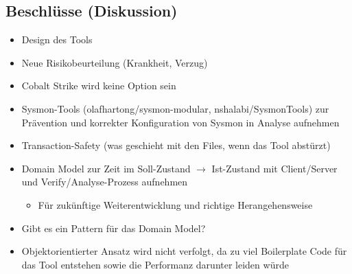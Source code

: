 \vspace{1cm}

\subsection*{Beschlüsse (Diskussion)}
\begin{itemize}
    \item Design des Tools
    \item Neue Risikobeurteilung (Krankheit, Verzug)
    \item Cobalt Strike wird keine Option sein
    \item Sysmon-Tools (olafhartong/sysmon-modular, nshalabi/SysmonTools) zur Prävention und korrekter Konfiguration von Sysmon in Analyse aufnehmen
    \item Transaction-Safety (was geschieht mit den Files, wenn das Tool abstürzt)
    \item Domain Model zur Zeit im Soll-Zustand $\rightarrow$ Ist-Zustand mit Client/Server und Verify/Analyse-Prozess aufnehmen
    \begin{itemize}
        \item Für zukünftige Weiterentwicklung und richtige Herangehensweise
    \end{itemize}
    \item Gibt es ein Pattern für das Domain Model?
    \item Objektorientierter Ansatz wird nicht verfolgt, da zu viel Boilerplate Code für das Tool entstehen sowie die Performanz darunter leiden würde
\end{itemize}

